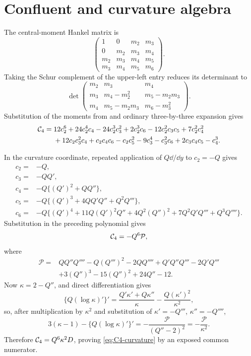 \section{Confluent and curvature algebra}\label{app:algebra}

The central-moment Hankel matrix is
\[
 \begin{pmatrix}
 1&0&m_2&m_3\\
 0&m_2&m_3&m_4\\
 m_2&m_3&m_4&m_5\\
 m_3&m_4&m_5&m_6
 \end{pmatrix}.
\]
Taking the Schur complement of the upper-left entry reduces its determinant to
\[
 \det\begin{pmatrix}
 m_2&m_3&m_4\\
 m_3&m_4-m_2^2&m_5-m_2m_3\\
 m_4&m_5-m_2m_3&m_6-m_3^2
 \end{pmatrix}.
\]
Substitution of the moments from  and ordinary
three-by-three expansion gives
\begin{align}\label{eq:C4-expanded}
\mathcal{C}_4={}&12c_2^6+24c_2^4c_4-24c_2^3c_3^2+2c_2^3c_6
-12c_2^2c_3c_5+7c_2^2c_4^2\\
&+12c_2c_3^2c_4+c_2c_4c_6-c_2c_5^2-9c_3^4-c_3^2c_6
+2c_3c_4c_5-c_4^3.
\end{align}

In the curvature coordinate, repeated application of
\(Q\dd/\dd y\) to \(c_2=-Q\) gives
\begin{align*}
c_2={}&-Q,\\
c_3={}&-QQ',\\
c_4={}&-Q\{(Q')^2+QQ''\},\\
c_5={}&-Q\{(Q')^3+4QQ'Q''+Q^2Q'''\},\\
c_6={}&-Q\{(Q')^4+11Q(Q')^2Q''+4Q^2(Q'')^2
 +7Q^2Q'Q'''+Q^3Q''''\}.
\end{align*}
Substitution in the preceding polynomial gives
\[
 \mathcal{C}_4=-Q^6\mathcal P,
\]
where
\begin{align*}
\mathcal P={}&QQ''Q''''-Q(Q''')^2-2QQ''''+Q'Q''Q'''-2Q'Q'''\\
&+3(Q'')^3-15(Q'')^2+24Q''-12.
\end{align*}
Now \(\kappa=2-Q''\), and direct differentiation gives
\[
 \{Q(\log\kappa)'\}'
 =\frac{Q'\kappa'+Q\kappa''}{\kappa}
  -\frac{Q(\kappa')^2}{\kappa^2},
\]
so, after multiplication by \(\kappa^2\) and substitution of
\(\kappa'= -Q'''\), \(\kappa''=-Q''''\),
\[
 3(\kappa-1)-\{Q(\log\kappa)'\}'
 =-\frac{\mathcal P}{(Q''-2)^2}
 =-\frac{\mathcal P}{\kappa^2}.
\]
Therefore \(\mathcal{C}_4=Q^6\kappa^2D\), proving
\eqref{eq:C4-curvature} by an exposed common numerator.
